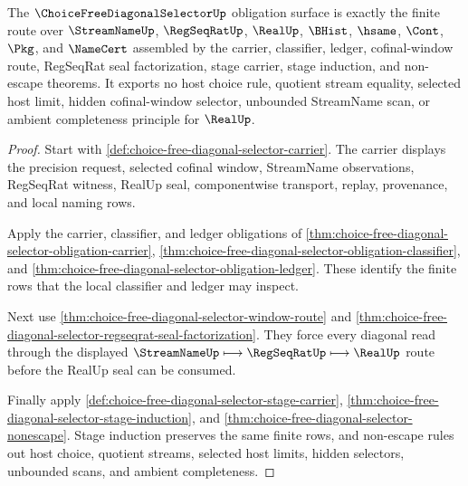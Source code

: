 \begin{theorem}
\label{thm:choice-free-diagonal-selector-obligation-closure}
The $\ChoiceFreeDiagonalSelectorUp$ obligation surface is exactly the finite route over $\StreamNameUp$, $\RegSeqRatUp$, $\RealUp$, $\BHist$, $\hsame$, $\Cont$, $\Pkg$, and $\NameCert$ assembled by the carrier, classifier, ledger, cofinal-window route, RegSeqRat seal factorization, stage carrier, stage induction, and non-escape theorems. It exports no host choice rule, quotient stream equality, selected host limit, hidden cofinal-window selector, unbounded StreamName scan, or ambient completeness principle for $\RealUp$.
\end{theorem}
\begin{proof}
Start with \autoref{def:choice-free-diagonal-selector-carrier}. The carrier displays the precision request, selected cofinal window, StreamName observations, RegSeqRat witness, RealUp seal, componentwise transport, replay, provenance, and local naming rows.

Apply the carrier, classifier, and ledger obligations of \autoref{thm:choice-free-diagonal-selector-obligation-carrier}, \autoref{thm:choice-free-diagonal-selector-obligation-classifier}, and \autoref{thm:choice-free-diagonal-selector-obligation-ledger}. These identify the finite rows that the local classifier and ledger may inspect.

Next use \autoref{thm:choice-free-diagonal-selector-window-route} and \autoref{thm:choice-free-diagonal-selector-regseqrat-seal-factorization}. They force every diagonal read through the displayed $\StreamNameUp\longmapsto \RegSeqRatUp\longmapsto \RealUp$ route before the RealUp seal can be consumed.

Finally apply \autoref{def:choice-free-diagonal-selector-stage-carrier}, \autoref{thm:choice-free-diagonal-selector-stage-induction}, and \autoref{thm:choice-free-diagonal-selector-nonescape}. Stage induction preserves the same finite rows, and non-escape rules out host choice, quotient streams, selected host limits, hidden selectors, unbounded scans, and ambient completeness.
\end{proof}

